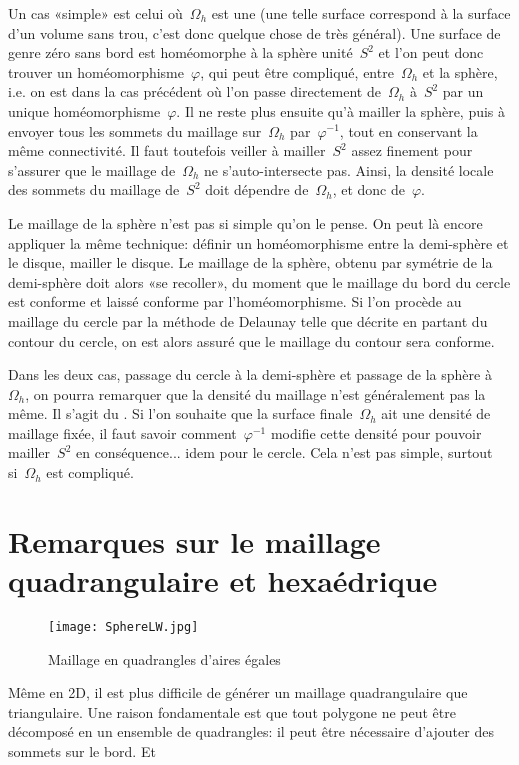 \medskip
Un cas «simple» est celui où~$\Omega_h$ est une  (une telle surface correspond à la surface d'un volume sans trou, c'est donc quelque chose de très général).
Une surface de genre zéro sans bord est homéomorphe à la sphère unité~$S^2$ et l'on peut donc trouver un homéomorphisme~$\varphi$, qui peut être compliqué, entre~$\Omega_h$ et la sphère, i.e. on est dans la cas précédent où l'on passe directement de~$\Omega_h$ à~$S^2$ par un unique homéomorphisme~$\varphi$. Il ne reste plus ensuite qu'à mailler la sphère, puis à envoyer tous les sommets du maillage sur~$\Omega_h$ par~$\varphi^{-1}$, tout en conservant la même connectivité. Il faut toutefois veiller à mailler~$S^2$ assez finement pour s'assurer que le maillage de~$\Omega_h$ ne s'auto-intersecte pas. Ainsi, la densité locale des sommets du maillage de~$S^2$ doit dépendre de~$\Omega_h$, et donc de~$\varphi$.

Le maillage de la sphère n'est pas si simple qu'on le pense.
On peut là encore appliquer la même technique: définir un homéomorphisme entre la demi-sphère et le disque, mailler le disque. Le maillage de la sphère, obtenu par symétrie de la demi-sphère doit alors «se recoller», du moment que le maillage du bord du cercle est conforme et laissé conforme par l'homéomorphisme. Si l'on procède au maillage du cercle par la méthode de Delaunay telle que décrite en partant du contour du cercle, on est alors assuré que le maillage du contour sera conforme.

Dans les deux cas, passage du cercle à la demi-sphère et passage de la sphère à~$\Omega_h$, on pourra remarquer que la densité du maillage n'est généralement pas la même. Il s'agit du . Si l'on souhaite que la surface finale~$\Omega_h$ ait une densité de maillage fixée, il faut savoir comment~$\varphi^{-1}$ modifie cette densité pour pouvoir mailler~$S^2$ en conséquence... idem pour le cercle. Cela n'est pas simple, surtout si~$\Omega_h$ est compliqué.

\medskip\ifVersionDuDocEstVincent\else\newpage\fi
\section{Remarques sur le maillage quadrangulaire et hexaédrique}\label{Sec-MeshQuad}

\begin{wrapfigure}{r}{45mm}
\begin{center}
\texttt{[image: SphereLW.jpg]}
\end{center}
\caption{Maillage en quadrangles d'aires égales}\label{Fig-sphereLW}
\end{wrapfigure}
Même en 2D, il est plus difficile de générer un maillage quadrangulaire que triangulaire.
Une raison fondamentale est que tout polygone ne peut être décomposé en un ensemble de quadrangles: il peut être nécessaire d'ajouter des sommets sur le bord. Et 

